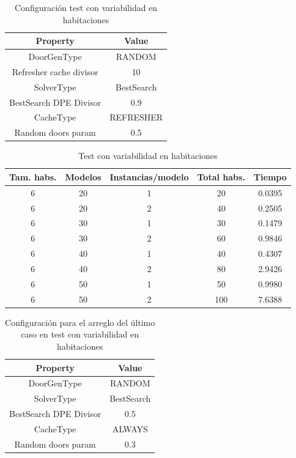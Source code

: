 \begin{table}[H]
\begin{center}
	\begin{tabular}{ | c | c | }
\hline
 		Property & Value \\ \hline
DoorGenType & RANDOM \\ 
Refresher cache divisor & 10 \\ 
SolverType & BestSearch \\ 
BestSearch DPE Divisor & 0.9 \\ 
CacheType & REFRESHER \\ 
Random doors param & 0.5 \\ 
\hline
	\end{tabular}
\end{center}
\caption{Configuración test con variabilidad en habitaciones}
\label{table:cfg-optvarsample}
\end{table}


\begin{table}[H]
\begin{center}
	\begin{tabular}{ | c | c | c | c | c | }
\hline
Tam. habs. & Modelos & Instancias/modelo & Total habs. & Tiempo \\ \hline 
6 & 20 & 1 & 20 & 0.0395 \\ 
6 & 20 & 2 & 40 & 0.2505 \\ 
6 & 30 & 1 & 30 & 0.1479 \\ 
6 & 30 & 2 & 60 & 0.9846 \\ 
6 & 40 & 1 & 40 & 0.4307 \\ 
6 & 40 & 2 & 80 & 2.9426 \\ 
6 & 50 & 1 & 50 & 0.9980 \\ 
6 & 50 & 2 & 100 & 7.6388 \\ 
\hline
	\end{tabular}
\end{center}
\caption{Test con variabilidad en habitaciones}
\label{table:optvarsample}
\end{table}


\begin{table}[H]
\begin{center}
	\begin{tabular}{ | c | c | }
\hline
 		Property & Value \\ \hline
DoorGenType & RANDOM \\ 
SolverType & BestSearch \\ 
BestSearch DPE Divisor & 0.5 \\ 
CacheType & ALWAYS \\ 
Random doors param & 0.3 \\ 
\hline
	\end{tabular}
\end{center}
\caption{Configuración para el arreglo del último caso en test con variabilidad en habitaciones}
\label{table:cfg-optvarfix}
\end{table}


